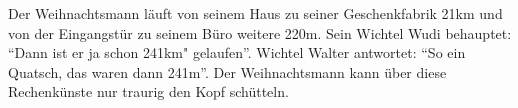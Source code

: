 \documentclass[a4paper]{scrartcl} %
\begin{document}
\noindent
Der Weihnachtsmann läuft von seinem Haus zu seiner Geschenkfabrik 21km und von der Eingangstür zu seinem Büro weitere 220m.
Sein Wichtel Wudi behauptet: "`Dann ist er ja schon 241km" gelaufen"'. Wichtel Walter antwortet: "`So ein Quatsch, das waren
dann 241m"'. Der Weihnachtsmann kann über diese Rechenkünste nur traurig den Kopf schütteln.
\end{document}
